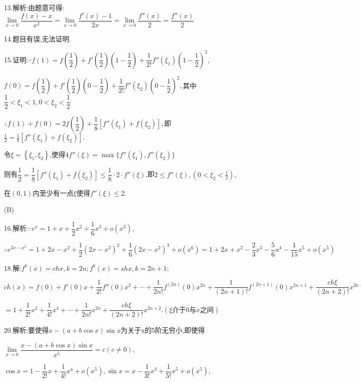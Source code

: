 13.解析:由题意可得:$\mathop {\lim }\limits_{x \to 0} \dfrac{{f(x) - x}}{{{x^2}}} = \mathop {\lim }\limits_{x \to 0} \dfrac{{f'(x) - 1}}{{2x}} = \mathop {\lim }\limits_{x \to 0} \dfrac{{f''(x)}}{2} = \dfrac{{f''(x)}}{2}$

14.题目有误,无法证明.

15.证明:$\because f(1) = f(\dfrac{1}{2}) + f'(\dfrac{1}{2})(1 - \dfrac{1}{2}) + \dfrac{1}{{2!}}f''({\xi _1}){(1 - \dfrac{1}{2})^2},$

$f(0) = f(\dfrac{1}{2}) + f'(\dfrac{1}{2})(0 - \dfrac{1}{2}) + \dfrac{1}{{2!}}f''({\xi _2}){(0 - \dfrac{1}{2})^2},$其中$\dfrac{1}{2} < {\xi _1} < 1,0 < {\xi _2} < \dfrac{1}{2}$

$\therefore f(1) + f(0) = 2f(\dfrac{1}{2}) + \dfrac{1}{8}[f''({\xi _1}) + f({\xi _2})],$即$\frac{1}{2} = \frac{1}{8}[f''({\xi _1}) + f({\xi _2})].$

令$\xi  = \left\{ {{\xi _1},{\xi _2}} \right\}$,使得$4f''(\xi ) = \max \{ f''({\xi _1}),f''({\xi _2})\} $

则有$\dfrac{1}{2} = \dfrac{1}{8}[f''({\xi _1}) + f({\xi _2})] \le \dfrac{1}{8} \cdot 2 \cdot f''(\xi )$,即$2 \le f''(\xi ),\left( {0 < {\xi _2} < \frac{1}{2}} \right)$,

在$(0,1)$内至少有一点$\xi $使得$f''(\xi ) \le 2$.

(B)

16.解析:$\because {e^x} = 1 + x + \dfrac{1}{2}{x^2} + \dfrac{1}{6}{x^3} + o({x^3}),$

$\therefore {e^{2x - {x^2}}} = 1 + 2x - {x^2} + \dfrac{1}{2}{(2x - {x^2})^2} + \dfrac{1}{6}{(2x - {x^2})^3} + o({x^6}) = 1 + 2x + {x^2} - \dfrac{2}{3}{x^3} - \dfrac{5}{6}{x^4} - \dfrac{1}{{15}}{x^5} + o({x^5})$

18.解:${f^k}(x) = chx,k = 2n;{f^k}(x) = shx,k = 2n + 1;$

$ch(x) = f(0) + f'(0)x + \dfrac{1}{{2!}}f''(0){x^2} +  \cdots  + \dfrac{1}{{2n!}}{f^{(2n)}}(0){x^{2n}} + \dfrac{1}{{(2n + 1)!}}{f^{(2n + 1)}}(0){x^{2n + 1}} + \dfrac{{ch\xi }}{{(2n + 2)!}}{x^{2n + 2}}$

$ = 1 + \dfrac{1}{{2!}}{x^2} + \dfrac{1}{{4!}}{x^4} +  \cdots  + \dfrac{1}{{2n!}}{x^{2n}} + \dfrac{{ch\xi }}{{(2n + 2)!}}{x^{2n + 2}}$.$(\xi 介于0与x之间)$

20.解析:要使得$x - (a + b\cos x)\sin x$为关于x的5阶无穷小,即使得

$\mathop {\lim }\limits_{x \to 0} \dfrac{{x - (a + b\cos x)\sin x}}{{{x^5}}} = c(c \ne 0),$

$\cos x = 1 - \dfrac{1}{{2!}}x + \dfrac{1}{{4!}}{x^4} + o({x^5}),\sin x = x - \dfrac{1}{{3!}}{x^3} + \dfrac{1}{{5!}}{x^5} + o({x^5})$,

